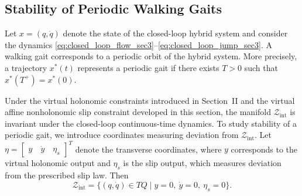 \documentclass[letterpaper, 10 pt, conference]{ieeeconf}
\begin{document}
{%



\subsection{Stability of Periodic Walking Gaits}

Let $x=(q,\dot q)$ denote the state of the closed-loop hybrid system and consider the dynamics \eqref{eq:closed_loop_flow_sec3}--\eqref{eq:closed_loop_jump_sec3}. A walking gait corresponds to a periodic orbit of the hybrid system. More precisely, a trajectory $x^\ast(t)$ represents a periodic gait if there exists $T>0$ such that $x^\ast(T^+) = x^\ast(0)$.

Under the virtual holonomic constraints introduced in Section~II and the virtual affine nonholonomic slip constraint developed in this section, the manifold $\mathcal Z_{\mathrm{int}}$ is invariant under the closed-loop continuous-time dynamics. To study stability of a periodic gait, we introduce coordinates measuring deviation from $\mathcal Z_{\mathrm{int}}$. Let $\eta =
\begin{bmatrix}
y\quad
\dot y\quad
\eta_s
\end{bmatrix}^{T}$ denote the transverse coordinates, where $y$ corresponds to the virtual holonomic output and $\eta_s$ is the slip output, which measures deviation from the prescribed slip law. Then
\[
\mathcal Z_{\mathrm{int}}
=
\{(q,\dot q)\in TQ \mid y=0,\ \dot y=0,\ \eta_s=0 \}.
\]

}
\end{document}
